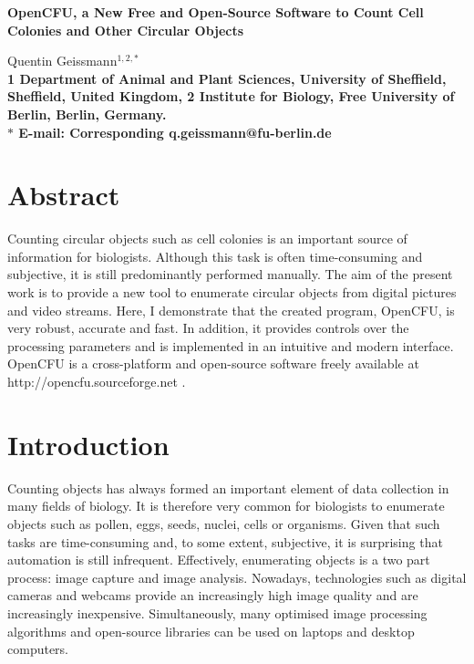 \documentclass[10pt]{article}
\date{}
\newcommand{\website}{http://opencfu.sourceforge.net}
\begin{document}

\begin{flushleft}
{\Large
\textbf{OpenCFU, a New Free and Open-Source Software to Count Cell Colonies and
Other Circular Objects}}

Quentin Geissmann$^{1,2,\ast}$
\\


\bf{1} Department of Animal and Plant Sciences, University of Sheffield,
Sheffield, United Kingdom, \bf{2} Institute for Biology, Free University of 
Berlin, Berlin, Germany. \\ $\ast$ E-mail: Corresponding
q.geissmann@fu-berlin.de
\end{flushleft}

\section*{Abstract}

Counting circular objects such as cell colonies is an important source of
information for biologists.
Although this task is often time-consuming and subjective, it is still
predominantly performed manually. The aim of the present work is to provide a
new tool to enumerate circular objects from digital pictures and video streams.
Here, I demonstrate that the created program, OpenCFU, is very robust, accurate and
fast. In addition, it provides controls over the processing parameters and is
implemented in an intuitive and modern interface. OpenCFU is a cross-platform
and open-source software freely available at \website{} .

\section*{Introduction}

Counting objects has always formed an important element of data collection in
many fields of biology.
It is therefore very common for
biologists to enumerate objects such as pollen\cite{costa_counting_2009},
eggs\cite{mello_image_2008}, seeds\cite{severini_counting_2011},
nuclei\cite{forero_deadeasy_2010}, cells\cite{kachouie_arraycount_2009} or organisms\cite{yati_flycounter:_2011}.
Given that
such tasks are time-consuming and, to some extent, subjective, it is
surprising that automation is still infrequent. 
Effectively, enumerating objects is a two part process: image capture and image
analysis. Nowadays, technologies such as digital cameras and webcams provide
an increasingly high image quality and are increasingly inexpensive.
Simultaneously, many optimised image processing
algorithms and open-source libraries can be used on laptops
and desktop computers.
\end{document}
